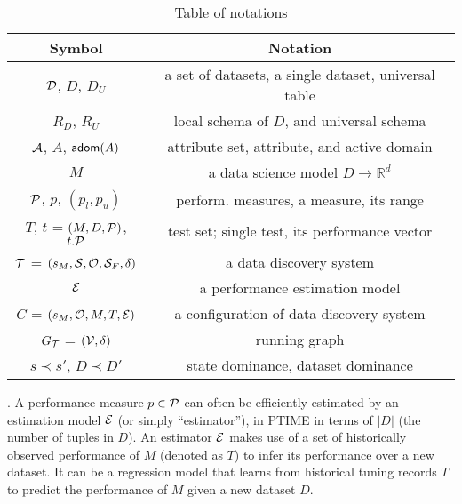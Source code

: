 \begin{table}[tb!]
\begin{small}
\begin{tabular}{|c|c|}
\hline
\textbf{Symbol} & \textbf{Notation} \\ 
\hline
$\D$, $D$, $D_U$ & a set of datasets, a single dataset, universal table\\
\hline
$R_D$, $R_U$ & local schema of $D$, and universal schema\\
\hline
$\A$, $A$, $\ad(A)$ & attribute set, attribute, and active domain\\
\hline
$M$ & a data science model $D\rightarrow \mathbb{R}^d$\\
\hline
$\P$, $p$, $(p_l,p_u)$ & perform. measures, a measure, its range \\
\hline
$T$, $t$ = $(M,D,\P)$, $t.\P$ %
& test set; single test, its performance vector \\
\hline
$\T$ = $(s_M, \S, \O, \S_F, \delta)$ & a data discovery system\\
\hline 
$\E$ & a performance estimation model \\
\hline 
$C$ = $(s_M, \O, M, T, \E)$ & a configuration of data discovery system \\
\hline
$G_\T$ = $(\V,\delta)$ & running graph \\
\hline
$s\prec s'$, $D\prec D'$ & state dominance, dataset dominance \\ \hline
\hline
\end{tabular}
\caption{Table of notations}
\vspace{-8ex}
\label{tab:notation}
\end{small}
\end{table}

. 
A performance measure $p\in\P$
can often be efficiently estimated by 
an estimation model $\E$ 
(or simply ``estimator''), in PTIME 
in terms of $|D|$ 
(the number of tuples in $D$). 
An estimator $\E$ makes use of a set of 
historically observed performance  
of $M$ (denoted as 
$T$) 
 to infer its performance over a new dataset. 
It can be a regression model that learns from historical 
tuning records $T$ to predict 
the performance of $M$ given a new 
dataset $D$. 

